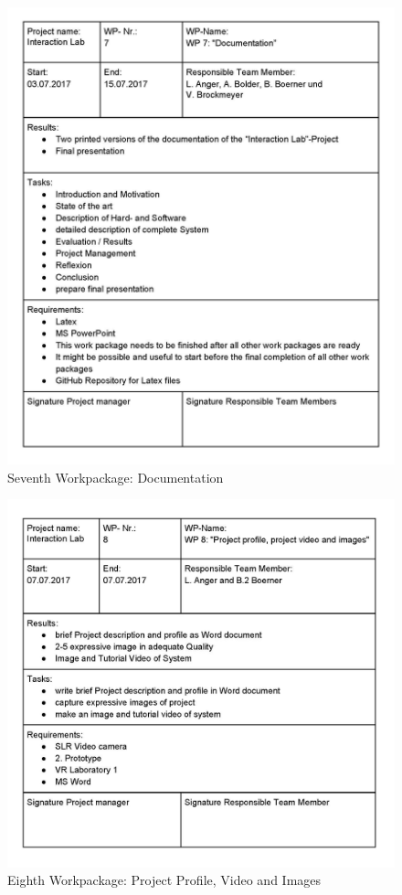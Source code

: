 \newpage
\begin{figure}[H] 
	\center 
	\includegraphics[width= 16 cm]{Images/Workpackages_Seite_7.jpg}			
	\caption[]{Seventh Workpackage: Documentation}
	\label{fig:Workpackage7}
\end{figure} 


\newpage
\begin{figure}[H] 
	\center 
	\includegraphics[width= 16 cm]{Images/Workpackages_Seite_8.jpg}			
	\caption[]{Eighth Workpackage: Project Profile, Video and Images}
	\label{fig:Workpackage8}
\end{figure} 















